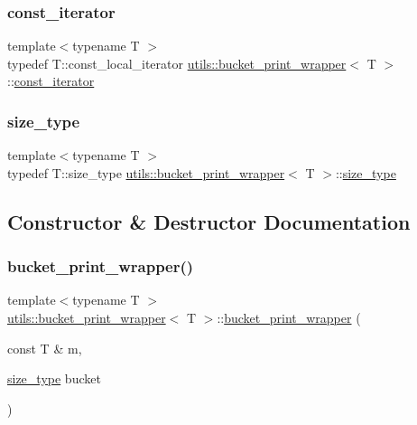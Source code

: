 \subsubsection{\texorpdfstring{const\_iterator}{const\_iterator}}
{\footnotesize\ttfamily template$<$typename T $>$ \\
typedef T\+::const\+\_\+local\+\_\+iterator \mbox{\hyperlink{structutils_1_1bucket__print__wrapper}{utils\+::bucket\+\_\+print\+\_\+wrapper}}$<$ T $>$\+::\mbox{\hyperlink{structutils_1_1bucket__print__wrapper_a366d347432ad92e4805eb1f14c287131}{const\+\_\+iterator}}}

\mbox{\label{structutils_1_1bucket__print__wrapper_a24e9dd014bd836f72cf6d410b669d812}} 
\subsubsection{\texorpdfstring{size\_type}{size\_type}}
{\footnotesize\ttfamily template$<$typename T $>$ \\
typedef T\+::size\+\_\+type \mbox{\hyperlink{structutils_1_1bucket__print__wrapper}{utils\+::bucket\+\_\+print\+\_\+wrapper}}$<$ T $>$\+::\mbox{\hyperlink{structutils_1_1bucket__print__wrapper_a24e9dd014bd836f72cf6d410b669d812}{size\+\_\+type}}}



\subsection{Constructor \& Destructor Documentation}
\mbox{\label{structutils_1_1bucket__print__wrapper_ae600a8ce56dfd669dfec51e55b2d15a6}} 
\subsubsection{\texorpdfstring{bucket\_print\_wrapper()}{bucket\_print\_wrapper()}}
{\footnotesize\ttfamily template$<$typename T $>$ \\
\mbox{\hyperlink{structutils_1_1bucket__print__wrapper}{utils\+::bucket\+\_\+print\+\_\+wrapper}}$<$ T $>$\+::\mbox{\hyperlink{structutils_1_1bucket__print__wrapper}{bucket\+\_\+print\+\_\+wrapper}} (\begin{DoxyParamCaption}\item[{const T \&}]{m,  }\item[{\mbox{\hyperlink{structutils_1_1bucket__print__wrapper_a24e9dd014bd836f72cf6d410b669d812}{size\+\_\+type}}}]{bucket }\end{DoxyParamCaption})\hspace{0.3cm}{\ttfamily [inline]}}



